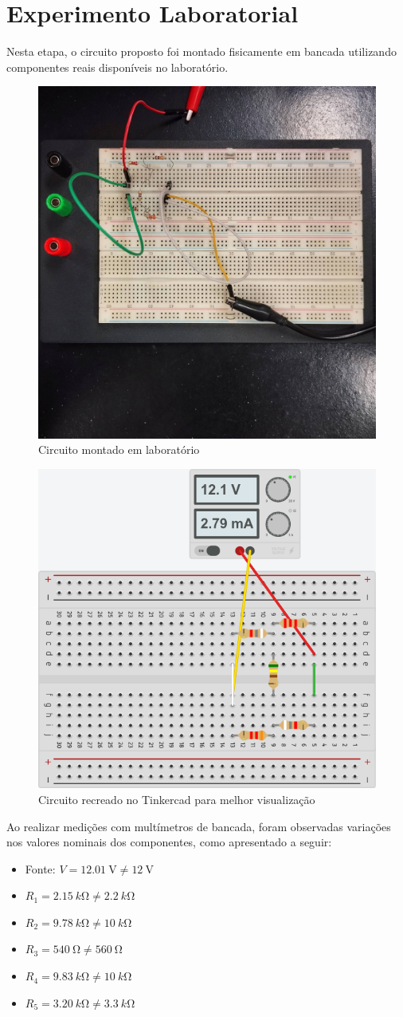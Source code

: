 \section{Experimento Laboratorial}

Nesta etapa, o circuito proposto foi montado fisicamente em bancada utilizando
componentes reais disponíveis no laboratório.

\begin{figure}[H]
  \centering
  \includegraphics[width=0.5\linewidth]{fig/lab1realcircuit.jpeg}
  \caption{Circuito montado em laboratório}
  \label{fig:real-circuit}
\end{figure}

\begin{figure}[H]
  \centering
  \includegraphics[width=0.5\linewidth]{fig/lab1tinkercad.png}
  \caption{Circuito recreado no Tinkercad para melhor visualização}
  \label{fig:tinkercad}
\end{figure}

Ao realizar medições com multímetros de bancada, foram observadas variações nos
valores nominais dos componentes, como apresentado a seguir:

\begin{itemize}
  \item Fonte: \(V = \SI{12.01}{\volt} \neq \SI{12}{\volt}\)
  \item \(R_1 = \SI{2.15}{k\ohm} \neq \SI{2.2}{k\ohm}\)
  \item \(R_2 = \SI{9.78}{k\ohm} \neq \SI{10}{k\ohm}\)
  \item \(R_3 = \SI{540}{\ohm} \neq \SI{560}{\ohm}\)
  \item \(R_4 = \SI{9.83}{k\ohm} \neq \SI{10}{k\ohm}\)
  \item \(R_5 = \SI{3.20}{k\ohm} \neq \SI{3.3}{k\ohm}\)
\end{itemize}

